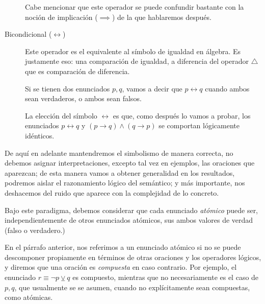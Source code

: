 \documentclass{book}
\theoremstyle{definition}
\begin{document}
\begin{description}
	Cabe mencionar que este operador se puede confundir bastante con la noción de implicación ($\implies$) de la que hablaremos después. %
	
	\item[Bicondicional ($\leftrightarrow$)] Este operador es el equivalente al símbolo de igualdad en álgebra. Es justamente eso: una comparación de igualdad, a diferencia del operador $\triangle$ que es comparación de diferencia.
	
	Si se tienen dos enunciados $p,q$, vamos a decir que $p\leftrightarrow q$ cuando ambos sean verdaderos, o ambos sean falsos.
	
	La elección del símbolo $\leftrightarrow$ es que, como después lo vamos a probar, los enunciados $p\leftrightarrow q$ y $(p \rightarrow q) \wedge (q \rightarrow p)$ se comportan lógicamente idénticos. %
\end{description}

De aquí en adelante mantendremos el simbolismo de manera correcta, no debemos asignar interpretaciones, excepto tal vez en ejemplos, las oraciones que aparezcan; de esta manera vamos a obtener generalidad en los resultados, podremos aislar el razonamiento lógico del semántico; y más importante, nos deshacemos del ruido que aparece con la complejidad de lo concreto.

Bajo este paradigma, debemos considerar que cada enunciado \emph{atómico} puede ser, independientemente de otros enunciados atómicos, sus ambos valores de verdad (falso o verdadero.)

En el párrafo anterior, nos referimos a un enunciado atómico si no se puede descomponer propiamente en términos de otras oraciones y los operadores lógicos, y diremos que una oración es \emph{compuesta} en caso contrario.
Por ejemplo, el enunciado $r \equiv \neg p \veebar q$ es compuesto, mientras que no necesariamente es el caso de $p,q$, que usualmente se se asumen, cuando no explícitamente sean compuestas, como atómicas.
\end{document}
